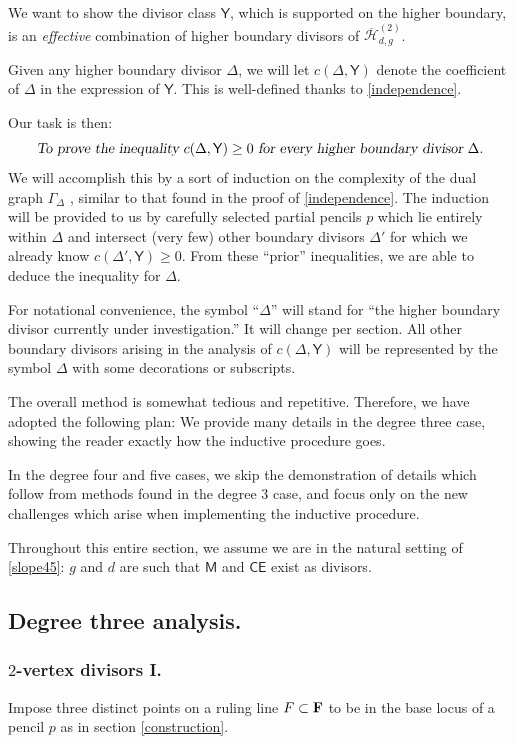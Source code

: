 \documentclass[reqno, 10 pt]{article}
\theoremstyle{definition}
\theoremstyle{remark}
\numberwithin{equation}{section}
\numberwithin{thm}{section}
\numberwithin{prop}{section}
\numberwithin{lem}{section}
\numberwithin{cor}{section}
\numberwithin{conj}{section}
\numberwithin{defn}{section}
\renewcommand{\H}{\mathcal H}
\newcommand{\F}{{\mathbf F}}
\newcommand{\Hdgnt}{\overline{\H}_{d,g}^{(2)}}
\newcommand{\sfY}{{\mathsf Y}}
\newcommand{\sfCE}{{\mathsf {CE}}}
\newcommand{\sfM}{{\mathsf M}}
\renewcommand{\F}{{\bf F}}
\renewcommand{\H}{{\mathcal{H}}}
\begin{document}
We want to show the divisor class $\sfY$, which is supported on the higher boundary, is an {\sl effective} combination of higher boundary divisors of $\Hdgnt$. 

Given any higher boundary divisor $\Delta$, we will let $c(\Delta, \sfY)$ denote the coefficient of $\Delta$ in the expression of $\sfY$. This is well-defined thanks to \autoref{independence}.

Our task is then: $$\text{\sl To prove the inequality $c(\Delta, \sfY) \geq 0$ for every higher boundary divisor $\Delta$.}$$  We will accomplish this by a sort of induction on the complexity of the dual graph $\Gamma_{\Delta}$ , similar to that found in the proof of \autoref{independence}.  The induction will be provided to us by carefully selected partial pencils $p$ which lie entirely within $\Delta$ and intersect (very few) other boundary divisors $\Delta'$ for which we already know $c(\Delta', \sfY) \geq 0$. From these ``prior'' inequalities, we are able to deduce the inequality for $\Delta$.

For notational convenience, the symbol ``$\Delta$'' will stand for ``the higher boundary divisor currently under investigation.''  It will change per section.  All other boundary divisors arising in the analysis of $c(\Delta, \sfY)$ will be represented by the symbol $\Delta$ with some decorations or subscripts.

The overall method is somewhat tedious and repetitive. Therefore, we have adopted the following plan:  We provide many details in the degree three case, showing the reader exactly how the inductive procedure goes. 

In the degree four and five cases, we skip the demonstration of details which follow from methods found in the degree $3$ case, and focus only on the new challenges which arise when implementing the inductive procedure. 

Throughout this entire section, we assume we are in the natural setting of \autoref{slope45}: $g$ and $d$ are such that $\sfM$ and $\sfCE$ exist as divisors.


\subsection{Degree three analysis.}

\subsubsection{$2$-vertex divisors I.}
Impose three distinct points on a ruling line $F \subset \F$ to be in the base locus of a pencil $p$ as in section \ref{construction}.  
\end{document}
